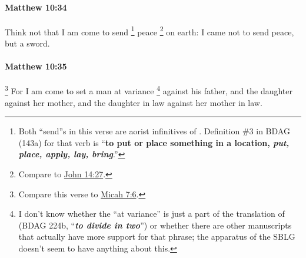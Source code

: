 		\paragraph{Matthew 10:34} %
			\label{MATTHEW-10-34}

			Think not that I am come to send%
				\footnote{%
					Both ``send''s in this verse are aorist infinitives of . Definition \#3 in BDAG (143a) for that verb is ``\textbf{to put or place something in a location, \textit{put, place, apply, lay, bring}}.''
					}
			peace%
				\footnote{%
					Compare to \hyperref[JOHN-14-27]{John 14:27}.
					} 
			on earth: I came not to send peace, but a sword.

			\begin{framed}
			\scriptsize
				\begin{compactdesc}
					\item[SBLG] 
				\end{compactdesc}
			\end{framed}

		\paragraph{Matthew 10:35} %
			\label{MATTHEW-10-35}

				\footnote{%
					Compare this verse to \hyperref[MICAH-7-6]{Micah 7:6}.
					}%
			For I am come to set a man at variance%
				\footnote{%
					I don't know whether the ``at variance'' is just a part of the translation of  (BDAG 224b, ``\textbf{\textit{to divide in two}}'') or whether there are other manuscripts that actually have more support for that phrase; the apparatus of the SBLG doesn't seem to have anything about this. 
					}
			against his father, and the daughter against her mother, and the daughter in law against her mother in law.

